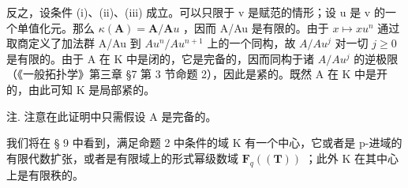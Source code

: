 反之，设条件 (i)、(ii)、(iii) 成立。可以只限于 v 是赋范的情形；设 u 是 v 的一个单值化元。那么 \(\kappa(\mathbf{A}) = \mathbf{A}/\mathbf{A}u\) ，因而 A/Au 是有限的。由于 \(x \mapsto xu^{n}\) 通过取商定义了加法群 A/Au 到 \(Au^{n}/Au^{n+1}\) 上的一个同构，故 \(A/Au^{j}\) 对一切 \(j \geqslant 0\) 是有限的。由于 A 在 K 中是闭的，它是完备的，因而同构于诸 \(A/Au^{j}\) 的逆极限（《一般拓扑学》第三章 §7 第 3 节命题 2），因此是紧的。既然 A 在 K 中是开的，由此可知 K 是局部紧的。

注. 注意在此证明中只需假设 A 是完备的。

我们将在 § 9 中看到，满足命题 2 中条件的域 K 有一个中心，它或者是 p-进域的有限代数扩张，或者是有限域上的形式幂级数域 \(\mathbf{F}_{q}((\mathbf{T}))\) ；此外 K 在其中心上是有限秩的。

